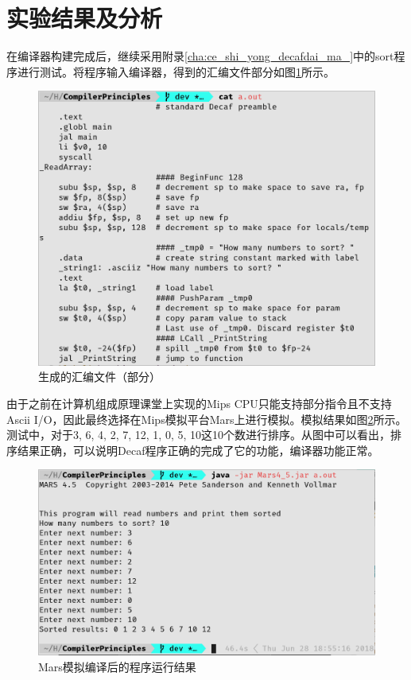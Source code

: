 \documentclass{report}
\begin{document}
\section{实验结果及分析}
\label{sec:shi_yan_jie_guo_ji_fen_xi_4}
\par 在编译器构建完成后，继续采用附录\ref{cha:ce_shi_yong_decafdai_ma_}中的sort程序进行测试。将程序输入编译器，得到的汇编文件部分如图\ref{fig:asm}所示。
\begin{figure}[htpb]
    \centering
    \includegraphics[width=0.74\linewidth]{asm.png}
    \caption{生成的汇编文件（部分）}
    \label{fig:asm}
\end{figure}

\par 由于之前在计算机组成原理课堂上实现的Mips CPU只能支持部分指令且不支持Ascii I/O，因此最终选择在Mips模拟平台Mars上进行模拟。模拟结果如图\ref{fig:simulate}所示。测试中，对于3, 6, 4, 2, 7, 12, 1, 0, 5, 10这10个数进行排序。从图中可以看出，排序结果正确，可以说明Decaf程序正确的完成了它的功能，编译器功能正常。
\begin{figure}[htpb]
    \centering
    \includegraphics[width=0.8\linewidth]{simulate.png}
    \caption{Mars模拟编译后的程序运行结果}
    \label{fig:simulate}
\end{figure}
\end{document}
